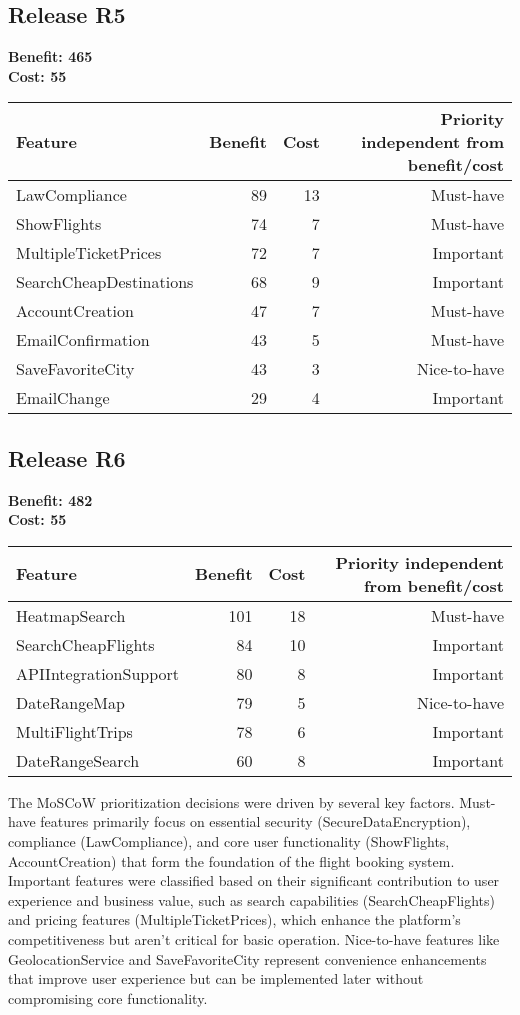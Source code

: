 \subsection{Release R5}
\textbf{Benefit: 465} \\
\textbf{Cost: 55} \\

\begin{tabular}{lrrr}
\toprule
\textbf{Feature} & \textbf{Benefit} & \textbf{Cost} & \textbf{Priority} independent from benefit/cost \\
\midrule
LawCompliance & 89 & 13 & Must-have \\
ShowFlights & 74 & 7 & Must-have \\
MultipleTicketPrices & 72 & 7 & Important \\
SearchCheapDestinations & 68 & 9 & Important \\
AccountCreation & 47 & 7 & Must-have \\
EmailConfirmation & 43 & 5 & Must-have \\
SaveFavoriteCity & 43 & 3 & Nice-to-have \\
EmailChange & 29 & 4 & Important \\
\bottomrule
\end{tabular}

\subsection{Release R6}
\textbf{Benefit: 482} \\
\textbf{Cost: 55} \\

\begin{tabular}{lrrr}
\toprule
\textbf{Feature} & \textbf{Benefit} & \textbf{Cost} & \textbf{Priority} independent from benefit/cost \\
\midrule
HeatmapSearch & 101 & 18 & Must-have \\
SearchCheapFlights & 84 & 10 & Important \\
APIIntegrationSupport & 80 & 8 & Important \\
DateRangeMap & 79 & 5 & Nice-to-have \\
MultiFlightTrips & 78 & 6 & Important \\
DateRangeSearch & 60 & 8 & Important \\
\bottomrule
\end{tabular}

The MoSCoW prioritization decisions were driven by several key factors. Must-have features primarily focus on essential security (SecureDataEncryption), compliance (LawCompliance), and core user functionality (ShowFlights, AccountCreation) that form the foundation of the flight booking system. Important features were classified based on their significant contribution to user experience and business value, such as search capabilities (SearchCheapFlights) and pricing features (MultipleTicketPrices), which enhance the platform's competitiveness but aren't critical for basic operation. Nice-to-have features like GeolocationService and SaveFavoriteCity represent convenience enhancements that improve user experience but can be implemented later without compromising core functionality.

